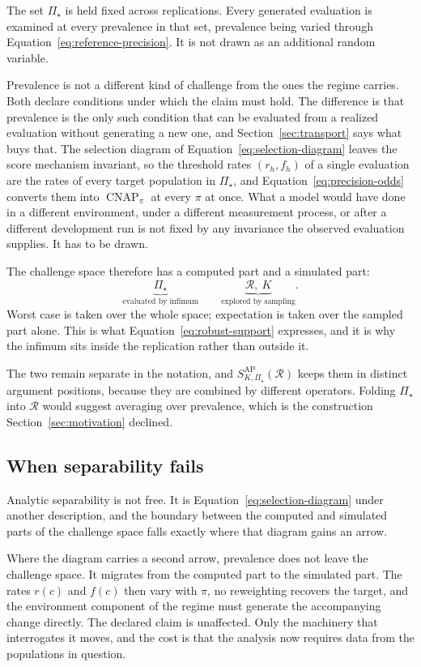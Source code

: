 \documentclass[11pt]{article}
\newcommand{\CNAP}{\operatorname{CNAP}}
\newcommand{\Regime}{\mathcal{R}}
\newcommand{\PSet}{\Pi_\star}
\theoremstyle{remark}
\begin{document}
The set $\PSet$ is held fixed across replications. Every generated evaluation is examined at every prevalence in that set, prevalence being varied through Equation~\eqref{eq:reference-precision}. It is not drawn as an additional random variable.

Prevalence is not a different kind of challenge from the ones the regime carries. Both declare conditions under which the claim must hold. The difference is that prevalence is the only such condition that can be evaluated from a realized evaluation without generating a new one, and Section~\ref{sec:transport} says what buys that. The selection diagram of Equation~\eqref{eq:selection-diagram} leaves the score mechanism invariant, so the threshold rates $(r_h,f_h)$ of a single evaluation are the rates of every target population in $\PSet$, and Equation~\eqref{eq:precision-odds} converts them into $\CNAP_\pi$ at every $\pi$ at once. What a model would have done in a different environment, under a different measurement process, or after a different development run is not fixed by any invariance the observed evaluation supplies. It has to be drawn.

The challenge space therefore has a computed part and a simulated part:
\[
\underbrace{\PSet}_{\text{evaluated by infimum}}
\qquad
\underbrace{\Regime,\ K}_{\text{explored by sampling}}.
\]
Worst case is taken over the whole space; expectation is taken over the sampled part alone. This is what Equation~\eqref{eq:robust-support} expresses, and it is why the infimum sits inside the replication rather than outside it.

The two remain separate in the notation, and $S_{K,\PSet}^{\mathrm{AP}}(\Regime)$ keeps them in distinct argument positions, because they are combined by different operators. Folding $\PSet$ into $\Regime$ would suggest averaging over prevalence, which is the construction Section~\ref{sec:motivation} declined.

\subsection{When separability fails}
\label{sec:separability}

Analytic separability is not free. It is Equation~\eqref{eq:selection-diagram} under another description, and the boundary between the computed and simulated parts of the challenge space falls exactly where that diagram gains an arrow.

Where the diagram carries a second arrow, prevalence does not leave the challenge space. It migrates from the computed part to the simulated part. The rates $r(c)$ and $f(c)$ then vary with $\pi$, no reweighting recovers the target, and the environment component of the regime must generate the accompanying change directly. The declared claim is unaffected. Only the machinery that interrogates it moves, and the cost is that the analysis now requires data from the populations in question.
\end{document}
